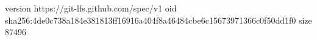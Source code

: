 version https://git-lfs.github.com/spec/v1
oid sha256:4de0c738a184e381813ff16916a404f8a46484cbe6c15673971366c0f50dd1f0
size 87496
